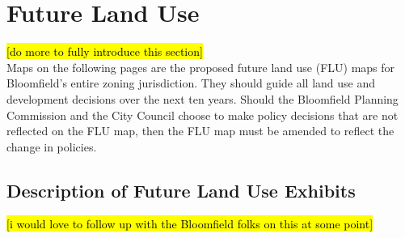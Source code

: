 \section{Future Land Use}

\noindent \hl{[do more to fully introduce this section]}\\

\noindent Maps on the following pages are the proposed future land use (FLU) maps for Bloomfield's entire zoning jurisdiction. They should guide all land use and development decisions over the next ten years. Should the Bloomfield Planning Commission and the City Council choose to make policy decisions that are not reflected on the FLU map, then the FLU map must be amended to reflect the change in policies.

\thispagestyle{empty}
\begin{landscape}
    
\end{landscape}

\pagebreak
\thispagestyle{empty}
\begin{landscape}
    
\end{landscape}

\pagebreak
\thispagestyle{empty}
\begin{landscape}
    
\end{landscape}

\pagebreak
\thispagestyle{empty}
\begin{landscape}
    
\end{landscape}

\pagebreak
\thispagestyle{empty}
\begin{landscape}
    
\end{landscape}

\pagebreak
\thispagestyle{empty}
\begin{landscape}
    
\end{landscape}

\pagebreak
\subsection{Description of Future Land Use Exhibits}

\noindent \hl{[i would love to follow up with the Bloomfield folks on this at some point]}

